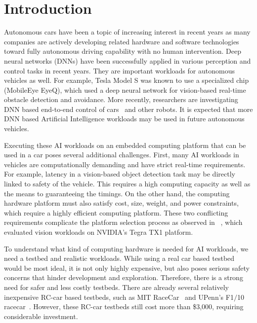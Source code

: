 \section{Introduction} \label{sec:intro}

%
%
Autonomous cars have been a topic of increasing interest in recent
years as many companies are actively developing related hardware
and software technologies toward fully autonomous driving capability with
no human intervention. Deep neural networks (DNNs) have been
successfully applied in various perception and control tasks in
recent years.  They are important workloads for autonomous vehicles
as well. For example, Tesla Model S was known to use a specialized
chip (MobileEye EyeQ), which used a deep neural network for vision-based
real-time obstacle detection and avoidance. More recently, researchers
are investigating DNN based end-to-end control of
cars~\cite{Bojarski2016} and other robots. It is expected that more
DNN based Artificial Intelligence workloads may be used in future
autonomous vehicles.

Executing these AI workloads on an embedded computing platform that can
be used in a car poses several additional challenges. First, many AI
workloads in vehicles are computationally demanding and have strict
real-time requirements. For example, latency in a vision-based object
detection task may be directly linked to safety of the vehicle. This
requires a high computing capacity as well as the means to guaranteeing
the timings. On the other hand, the computing hardware platform must
also satisfy cost, size, weight, and power constraints, which require a
highly efficient computing platform. These two conflicting
requirements  complicate the platform selection process as observed in
~\cite{Otterness2017}, which evaluated vision workloads on
NVIDIA's Tegra TX1 platform.


To understand what kind of computing hardware is needed for AI
workloads, we need a testbed and realistic workloads. While using a real car
based testbed would be most ideal, it is not only highly expensive, but also
poses serious safety concerns that hinder development and exploration.
Therefore, there is a strong need for safer and less costly
testbeds. There are already several relatively inexpensive RC-car
based testbeds, such as MIT 
RaceCar~\cite{shin2017project} and UPenn's F1$/$10 racecar~\cite{upennf1tenth}.
However, these RC-car testbeds still cost more than \$3,000, requiring
considerable investment.

